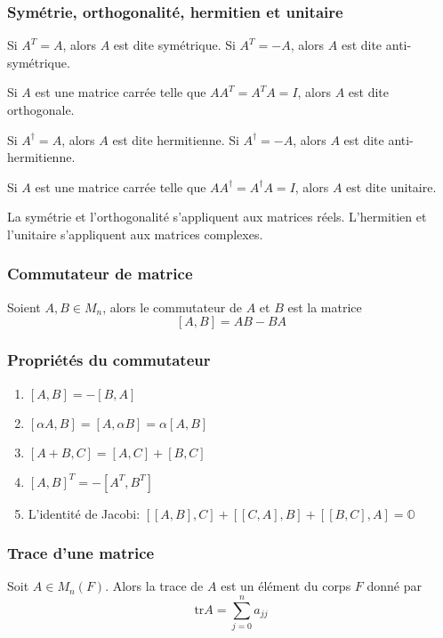 \subsubsection{Symétrie, orthogonalité, hermitien et unitaire}
\begin{definition}
    Si $A^T = A$, alors $A$ est dite symétrique. Si $A^T = -A$, alors $A$ est dite anti-symétrique.
\end{definition}
\begin{definition}
    Si $A$ est une matrice carrée telle que $AA^T = A^TA = I$, alors $A$ est dite orthogonale.
\end{definition}
\begin{definition}
    Si $A^\dagger = A$, alors $A$ est dite hermitienne. Si $A^\dagger = -A$, alors $A$ est dite anti-hermitienne.
\end{definition}
\begin{definition}
    Si $A$ est une matrice carrée telle que $AA^\dagger = A^\dagger A = I$, alors $A$ est dite unitaire.
\end{definition}
\begin{remark}
    La symétrie et l'orthogonalité s'appliquent aux matrices réels. L'hermitien et l'unitaire s'appliquent aux matrices complexes.
\end{remark}

\subsubsection{Commutateur de matrice}
Soient $A, B \in M_n$, alors le commutateur de $A$ et $B$ est la matrice
\[ \left[ A, B \right] = AB - BA \]

\subsubsection{Propriétés du commutateur}
\begin{enumerate}
    \item $[A, B] = -[B, A]$
    \item $[\alpha A, B ] = [A, \alpha B] = \alpha [A, B]$
    \item $[A + B, C] = [A, C] + [B, C]$
    \item $[A, B]^T = -[A^T, B^T]$
    \item L'identité de Jacobi: $[[A, B], C] + [[C, A], B] + [[B, C], A] = \mathbb{O}$
\end{enumerate}

\subsubsection{Trace d'une matrice}
Soit $A \in M_n(F)$. Alors la trace de $A$ est un élément du corps $F$ donné par
\[ \text{tr}A =  \sum_{j = 0}^{n} a_{jj} \]

